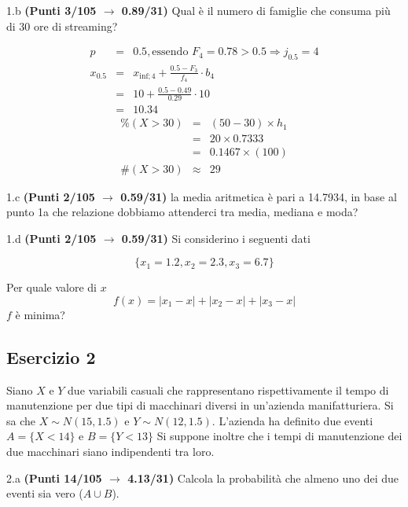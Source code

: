 \documentclass[
  11pt,
]{book}
\theoremstyle{mytheoremstyle}
\theoremstyle{mydefstyle}
\newenvironment{sol}
  {
  \begin{tcolorbox}[enhanced,breakable,arc=0.1mm,boxrule=1pt,colback=white,colframe=iblue,
  title=\bf \fontfamily{lmss}\selectfont \hspace{.5 cm} Soluzione,drop fuzzy shadow]

}{
\end{tcolorbox}
  }
\begin{document}
1.b \textbf{(Punti 3/105 \(\rightarrow\) 0.89/31)} Qual è il numero di famiglie che consuma più di 30 ore di streaming?

\begin{sol}
\begin{eqnarray*}
  p &=&  0.5 , \text{essendo }F_{ 4 }= 0.78  > 0.5  \Rightarrow j_{ 0.5 }= 4 \\
  x_{ 0.5 } &=& x_{\text{inf}; 4 } + \frac{ { 0.5 } - F_{ 3 }} {f_{ 4 }} \cdot b_{ 4 } \\
            &=&  10  + \frac {{ 0.5 } -  0.49 } { 0.29 } \cdot  10  \\
            &=&  10.34 
\end{eqnarray*}
\begin{eqnarray*}
     \%(X> 30 ) &=&( 50 - 30 )\times h_1 \\
              &=& 20 \times  0.7333 \\
              &=&  0.1467 \times(100)\\
     \#(X> 30 ) &\approx& 29 
         \end{eqnarray*}

\end{sol}

1.c \textbf{(Punti 2/105 \(\rightarrow\) 0.59/31)} la media aritmetica è pari a 14.7934, in base al punto 1a che relazione dobbiamo attenderci tra media, mediana e moda?

1.d \textbf{(Punti 2/105 \(\rightarrow\) 0.59/31)} Si considerino i seguenti dati

\[
\{x_1=1.2,x_2=2.3,x_3=6.7\}
\]

Per quale valore di \(x\)
\[
f(x)=|x_1-x|+|x_2-x|+|x_3-x|
\]
\(f\) è minima?

\subsection{Esercizio 2}\label{esercizio-2-33}

Siano \(X\) e \(Y\) due variabili casuali che rappresentano rispettivamente il tempo di manutenzione per due tipi di macchinari diversi in un'azienda manifatturiera. Si sa che \(X\sim N(15,1.5)\) e \(Y\sim N(12,1.5)\). L'azienda ha definito due eventi \(A=\{X< 14\}\) e \(B=\{Y<13\}\)
Si suppone inoltre che i tempi di manutenzione dei due macchinari siano indipendenti tra loro.

2.a \textbf{(Punti 14/105 \(\rightarrow\) 4.13/31)} Calcola la probabilità che almeno uno dei due eventi sia vero (\(A \cup B\)).
\end{document}
